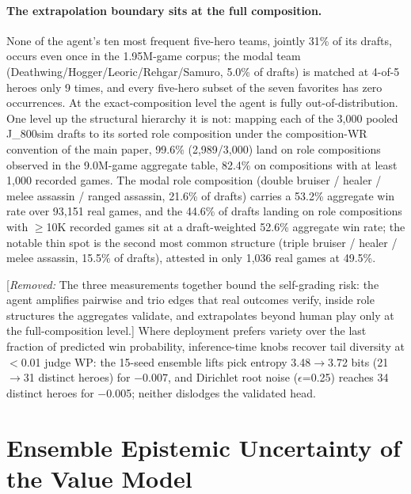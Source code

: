 \documentclass[journal]{IEEEtran}
\newcommand{\removed}[1]{{\color{red}[\textit{Removed:} #1]}}
\newcommand{\removed}[1]{}
\begin{document}
\paragraph{The extrapolation boundary sits at the full composition.} None of the agent's ten most frequent five-hero teams, jointly 31\% of its drafts, occurs even once in the 1.95M-game corpus; the modal team (Deathwing/Hogger/Leoric/Rehgar/Samuro, 5.0\% of drafts) is matched at 4-of-5 heroes only 9 times, and every five-hero subset of the seven favorites has zero occurrences. At the exact-composition level the agent is fully out-of-distribution. One level up the structural hierarchy it is not: mapping each of the 3,000 pooled J\_800sim drafts to its sorted role composition under the composition-WR convention of the main paper, 99.6\% (2,989/3,000) land on role compositions observed in the 9.0M-game aggregate table, 82.4\% on compositions with at least 1,000 recorded games. The modal role composition (double bruiser / healer / melee assassin / ranged assassin, 21.6\% of drafts) carries a 53.2\% aggregate win rate over 93{,}151 real games, and the 44.6\% of drafts landing on role compositions with $\geq$10K recorded games sit at a draft-weighted 52.6\% aggregate win rate; the notable thin spot is the second most common structure (triple bruiser / healer / melee assassin, 15.5\% of drafts), attested in only 1{,}036 real games at 49.5\%.

\removed{The three measurements together bound the self-grading risk: the agent amplifies pairwise and trio edges that real outcomes verify, inside role structures the aggregates validate, and extrapolates beyond human play only at the full-composition level.} Where deployment prefers variety over the last fraction of predicted win probability, inference-time knobs recover tail diversity at $<$0.01 judge WP: the 15-seed ensemble lifts pick entropy 3.48$\to$3.72 bits (21$\to$31 distinct heroes) for $-$0.007, and Dirichlet root noise ($\epsilon$=0.25) reaches 34 distinct heroes for $-$0.005; neither dislodges the validated head.

\section{Ensemble Epistemic Uncertainty of the Value Model}
\label{sec:ensemble}
\end{document}
